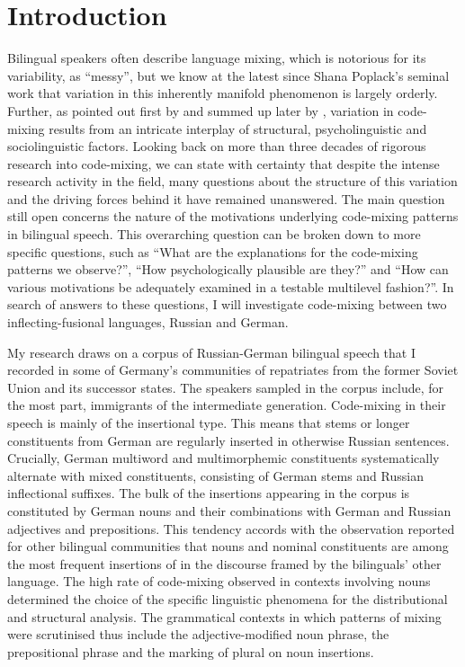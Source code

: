 \chapter*{Introduction} %

Bilingual speakers often describe language mixing, which is notorious for its variability, as “messy”, but we know at the latest since Shana Poplack's seminal \citeyear{poplack-sometimes-1980} work that variation in this inherently manifold phenomenon is largely orderly. Further, as pointed out first by \citet{bokamba89} and summed up later by \citet[][487]{muysken-etal96}, variation in code-mixing results from an intricate interplay of structural, psycholinguistic and sociolinguistic factors. Looking back on more than three decades of rigorous research into code-mixing, we can state with certainty that despite the intense research activity in the field, many questions about the structure of this variation and the driving forces behind it have remained unanswered. The main question still open concerns the nature of the motivations underlying code-mixing patterns in bilingual speech. This overarching question can be broken down to more specific questions, such as ``What are the explanations for the code-mixing patterns we observe?'', ``How psychologically plausible are they?'' and ``How can various motivations be adequately examined in a testable multilevel fashion?''. In search of answers to these questions, I will investigate code-mixing between two inflecting-fusional languages, Russian and German.

My research draws on a corpus of Russian-German bilingual speech that I recorded in some of Germany's communities of repatriates from the former Soviet Union and its successor states. The speakers sampled in the corpus include, for the most part, immigrants of the intermediate generation. Code-mixing in their speech is mainly of the insertional type. This means that stems or longer constituents from German are regularly inserted in otherwise Russian sentences. Crucially, German multiword and multimorphemic constituents systematically alternate with mixed constituents, consisting of German stems and Russian inflectional suffixes. The bulk of the insertions appearing in the corpus is constituted by German nouns and their combinations with German and Russian adjectives and prepositions. This tendency accords with the observation reported for other bilingual communities that nouns and nominal constituents are among the most frequent insertions of in the discourse framed by the bilinguals' other language. The high rate of code-mixing observed in  contexts involving nouns determined the choice of the specific linguistic phenomena for the distributional and structural analysis. The grammatical contexts in which patterns of mixing were scrutinised thus include the adjective-modified noun phrase, the prepositional phrase and the marking of plural on noun insertions. 

